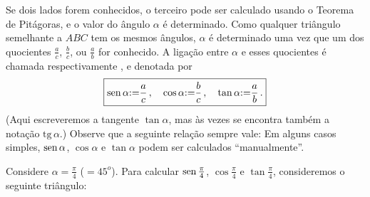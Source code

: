  Se dois lados forem conhecidos, o terceiro pode ser calculado usando o Teorema de
Pitágoras, e  o valor do ângulo $\alpha$ é determinado.
Como qualquer triângulo semelhante a $ABC$ tem os mesmos ângulos, $\alpha$ é
determinado uma vez que um dos quocientes $\tfrac{a}{c}$, $\tfrac{b}{c}$, ou
$\tfrac{a}{b}$ for conhecido. A ligação entre $\alpha$ e esses quocientes é
chamada respectivamente
, e
denotada por
$$\boxed{\operatorname{sen} \alpha{:=} \frac{a}{c}\,,\quad 
\cos \alpha{:=} \frac{b}{c}\,,\quad 
\tan \alpha{:=} \frac{a}{b}\,.}$$
(Aqui escreveremos a tangente $\tan \alpha$, mas às vezes se encontra
também a notação $\mathrm{tg}\,\alpha$.)
Observe que a seguinte relação sempre vale:
\eq{\label{eqtrigo1}
\tan \alpha=\frac{\sen \alpha}{\cos \alpha}}
Em alguns casos simples, $\operatorname{sen} \alpha$, $\cos \alpha$ e $\tan \alpha$ podem ser
calculados ``manualmente''. 
\begin{ex} Considere $\alpha=\tfrac{\pi}{4}$ ($=45^o$). Para calcular 
$\operatorname{sen} \tfrac{\pi}{4}$, $\cos \tfrac{\pi}{4}$ e $\tan \tfrac{\pi}{4}$, 
consideremos o seguinte triângulo:
\begin{center}
\begin{bmlimage}\end{bmlimage}
\end{center}
\end{ex}

